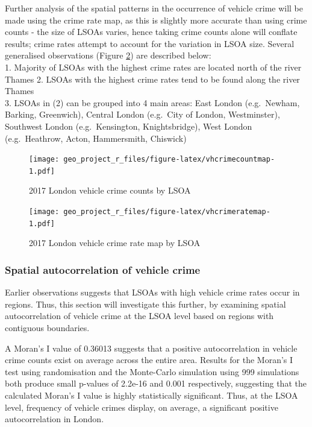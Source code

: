\documentclass[]{article}
\begin{document}
Further analysis of the spatial patterns in the occurrence of vehicle
crime will be made using the crime rate map, as this is slightly more
accurate than using crime counts - the size of LSOAs varies, hence
taking crime counts alone will conflate results; crime rates attempt to
account for the variation in LSOA size. Several generalised observations
(Figure \ref{fig:vhcrimeratemap}) are described below:\\
1. Majority of LSOAs with the highest crime rates are located north of
the river Thames 2. LSOAs with the highest crime rates tend to be found
along the river Thames\\
3. LSOAs in (2) can be grouped into 4 main areas: East London
(e.g.~Newham, Barking, Greenwich), Central London (e.g.~City of London,
Westminster), Southwest London (e.g.~Kensington, Knightsbridge), West
London (e.g.~Heathrow, Acton, Hammersmith, Chiswick)

\begin{figure}
\centering
\texttt{[image: geo\_project\_r\_files/figure-latex/vhcrimecountmap-1.pdf]}
\caption{\label{fig:vhcrimecountmap}2017 London vehicle crime counts by
LSOA}
\end{figure}

\begin{figure}
\centering
\texttt{[image: geo\_project\_r\_files/figure-latex/vhcrimeratemap-1.pdf]}
\caption{\label{fig:vhcrimeratemap}2017 London vehicle crime rate map by
LSOA}
\end{figure}

\subsubsection{Spatial autocorrelation of vehicle
crime}\label{spatial-autocorrelation-of-vehicle-crime}

Earlier observations suggests that LSOAs with high vehicle crime rates
occur in regions. Thus, this section will investigate this further, by
examining spatial autocorrelation of vehicle crime at the LSOA level
based on regions with contiguous boundaries.

A Moran's I value of 0.36013 suggests that a positive autocorrelation in
vehicle crime counts exist on average across the entire area. Results
for the Moran's I test using randomisation and the Monte-Carlo
simulation using 999 simulations both produce small p-values of 2.2e-16
and 0.001 respectively, suggesting that the calculated Moran's I value
is highly statistically significant. Thus, at the LSOA level, frequency
of vehicle crimes display, on average, a significant positive
autocorrelation in London.
\end{document}
